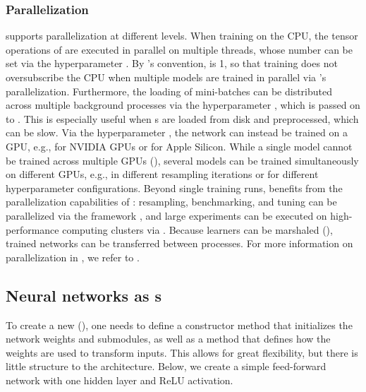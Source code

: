 \documentclass[article,shortnames]{jss}
\theoremstyle{definition}
\begin{document}
\subsubsection{Parallelization}\label{sec:parallelization}
\mlrttorch{} supports parallelization at different levels.
When training on the CPU, the tensor operations of \torch{} are executed in parallel on multiple threads, whose number can be set via the hyperparameter .
By \mlrt{}'s convention,  is 1, so that training does not oversubscribe the CPU when multiple models are trained in parallel via \mlrt{}'s parallelization.
Furthermore, the loading of mini-batches can be distributed across multiple background processes via the hyperparameter , which is passed on to .
This is especially useful when s are loaded from disk and preprocessed, which can be slow.
Via the hyperparameter , the network can instead be trained on a GPU, e.g.,  for NVIDIA GPUs or  for Apple Silicon.
While a single model cannot be trained across multiple GPUs (), several models can be trained simultaneously on different GPUs, e.g., in different resampling iterations or for different hyperparameter configurations.
Beyond single training runs, \mlrttorch{} benefits from the parallelization capabilities of \mlrt{}:
resampling, benchmarking, and tuning can be parallelized via the  framework \citep{ref-future}, and large experiments can be executed on high-performance computing clusters via  \citep{ref-mlr3batchmark}.
Because \mlrttorch{} learners can be marshaled (), trained networks can be transferred between processes.
For more information on parallelization in \mlrt{}, we refer to \citet{ref-mlr3book-technical}.

\subsection[Neural networks as Graphs]{Neural networks as s}\label{sec:graphs}

To create a new  (), one needs to define a constructor method that initializes the network weights and submodules, as well as a  method that defines how the weights are used to transform inputs.
This allows for great flexibility, but there is little structure to the architecture.
Below, we create a simple feed-forward network with one hidden layer and ReLU activation.
\end{document}
